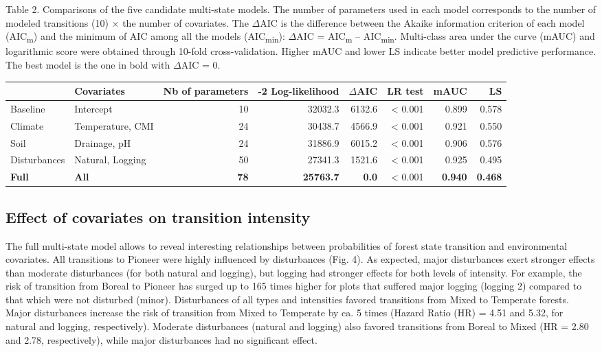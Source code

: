 \documentclass[a4paperpaper,]{article}
\begin{document}
Table 2. Comparisons of the five candidate multi-state models. The
number of parameters used in each model corresponds to the number of
modeled transitions (10) \(\times\) the number of covariates. The
\(\Delta\)AIC is the difference between the Akaike information criterion
of each model (AIC\textsubscript{m}) and the minimum of AIC among all
the models (AIC\textsubscript{min}): \(\Delta\)AIC =
AIC\textsubscript{m} -- AIC\textsubscript{min}. Multi-class area under
the curve (mAUC) and logarithmic score were obtained through 10-fold
cross-validation. Higher mAUC and lower LS indicate better model
predictive performance. The best model is the one in bold with
\(\Delta\)AIC = 0.

\begin{longtable}[]{@{}llrrrrrr@{}}
\toprule
& Covariates & Nb of parameters & -2 Log-likelihood & \(\Delta\)AIC & LR
test & mAUC & LS\tabularnewline
\midrule
\endhead
Baseline & Intercept & 10 & 32032.3 & 6132.6 & \textless{} 0.001 & 0.899
& 0.578\tabularnewline
Climate & Temperature, CMI & 24 & 30438.7 & 4566.9 & \textless{} 0.001 &
0.921 & 0.550\tabularnewline
Soil & Drainage, pH & 24 & 31886.9 & 6015.2 & \textless{} 0.001 & 0.906
& 0.576\tabularnewline
Disturbances & Natural, Logging & 50 & 27341.3 & 1521.6 & \textless{}
0.001 & 0.925 & 0.495\tabularnewline
\textbf{Full} & \textbf{All} & \textbf{78} & \textbf{25763.7} &
\textbf{0.0} & \textless{} 0.001 & \textbf{0.940} &
\textbf{0.468}\tabularnewline
\bottomrule
\end{longtable}

\pagebreak

\hypertarget{effect-of-covariates-on-transition-intensity}{%
\subsection{Effect of covariates on transition
intensity}\label{effect-of-covariates-on-transition-intensity}}

The full multi-state model allows to reveal interesting relationships
between probabilities of forest state transition and environmental
covariates. All transitions to Pioneer were highly influenced by
disturbances (Fig. 4). As expected, major disturbances exert stronger
effects than moderate disturbances (for both natural and logging), but
logging had stronger effects for both levels of intensity. For example,
the risk of transition from Boreal to Pioneer has surged up to 165 times
higher for plots that suffered major logging (logging 2) compared to
that which were not disturbed (minor). Disturbances of all types and
intensities favored transitions from Mixed to Temperate forests. Major
disturbances increase the risk of transition from Mixed to Temperate by
ca. 5 times (Hazard Ratio (HR) = 4.51 and 5.32, for natural and logging,
respectively). Moderate disturbances (natural and logging) also favored
transitions from Boreal to Mixed (HR = 2.80 and 2.78, respectively),
while major disturbances had no significant effect.
\end{document}
